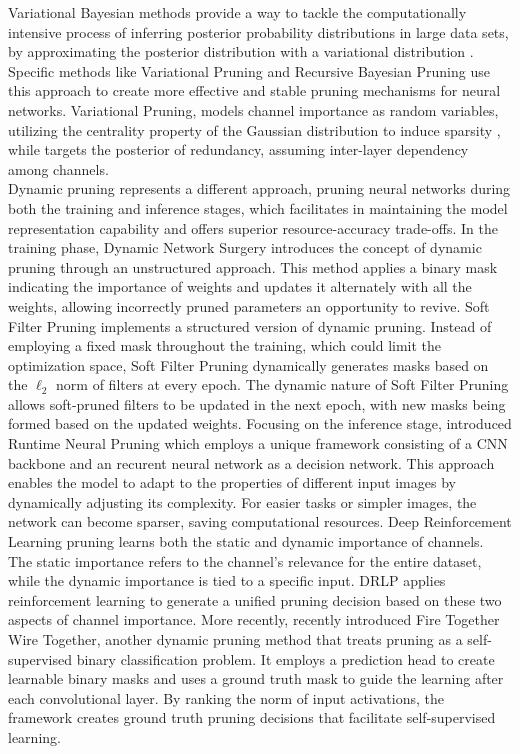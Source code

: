 Variational Bayesian methods provide a way to tackle the computationally
intensive process of inferring posterior probability distributions in large data
sets, by approximating the posterior distribution with a variational
distribution \cite{fox2012tutorial}. Specific methods like Variational Pruning
\cite{DBLP:conf/cvpr/ZhaoNZZZT19} and Recursive Bayesian Pruning
\cite{DBLP:conf/iccv/Zhou0W019} use this approach to create more effective and
stable pruning mechanisms for neural networks. Variational Pruning, models
channel importance as random variables, utilizing the centrality property of the
Gaussian distribution to induce sparsity \cite{DBLP:conf/cvpr/ZhaoNZZZT19},
while \cite{DBLP:conf/iccv/Zhou0W019} targets the posterior of redundancy,
assuming inter-layer dependency among channels.\\


Dynamic pruning represents a different approach, pruning neural networks during
both the training and inference stages, which facilitates in maintaining the
model representation capability and offers superior resource-accuracy
trade-offs. In the training phase, Dynamic Network Surgery
\cite{DBLP:conf/nips/GuoYC16} introduces the concept of dynamic pruning through
an unstructured approach. This method applies a binary mask indicating the
importance of weights and updates it alternately with all the weights, allowing
incorrectly pruned parameters an opportunity to revive. Soft Filter Pruning
\cite{DBLP:conf/ijcai/HeKDFY18} implements a structured version of dynamic
pruning. Instead of employing a fixed mask throughout the training, which could
limit the optimization space, Soft Filter Pruning dynamically generates masks
based on the $\ell_2$ norm of filters at every epoch. The dynamic nature of Soft
Filter Pruning allows soft-pruned filters to be updated in the next epoch, with
new masks being formed based on the updated weights. Focusing on the inference
stage, \citeauthor{DBLP:conf/nips/LinRLZ17} introduced Runtime Neural Pruning
\cite{DBLP:conf/nips/LinRLZ17} which employs a unique framework consisting of a
\ac{CNN} backbone and an recurent neural network as a decision network. This
approach enables the model to adapt to the properties of different input images
by dynamically adjusting its complexity. For easier tasks or simpler images, the
network can become sparser, saving computational resources. Deep Reinforcement
Learning pruning \cite{DBLP:conf/nips/ChenCP20} learns both the static and
dynamic importance of channels. The static importance refers to the channel's
relevance for the entire dataset, while the dynamic importance is tied to a
specific input. DRLP applies reinforcement learning to generate a unified
pruning decision based on these two aspects of channel importance. More
recently, \citeauthor{DBLP:conf/cvpr/ElkerdawyE0R22} recently introduced Fire
Together Wire Together, another dynamic pruning method that treats pruning as a
self-supervised binary classification problem. It employs a prediction head to
create learnable binary masks and uses a ground truth mask to guide the learning
after each convolutional layer. By ranking the norm of input activations, the
framework creates ground truth pruning decisions that facilitate self-supervised
learning. \\

